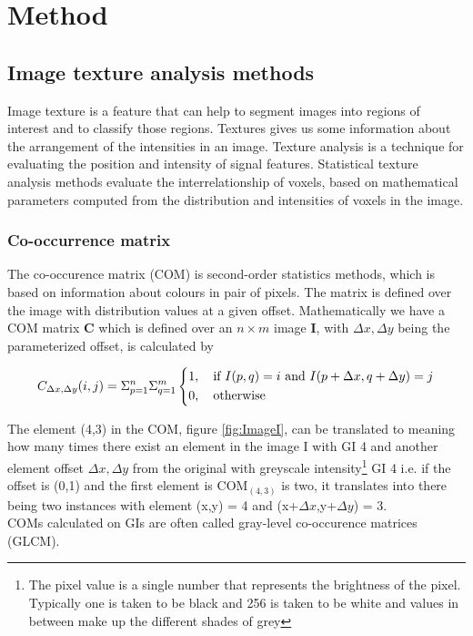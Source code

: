 \chapter{Method}


\section{Image texture analysis methods}

Image texture is a feature that can help to segment images into regions of interest and to classify those regions. Textures gives us some information about the arrangement of the intensities in an image. Texture analysis is a technique for evaluating the position and intensity of signal features\cite{Castellano}. Statistical texture analysis methods evaluate the interrelationship of voxels, based on mathematical parameters computed from the distribution and intensities of voxels in the image.

\subsection{Co-occurrence matrix}

The co-occurence matrix (COM) is second-order statistics methods, which is based on information about colours in pair of pixels. The matrix is defined over the image with distribution values at a given offset. Mathematically we have a COM matrix \textbf{C} which is defined over an $n \times m$ image \textbf{I}, with $\Delta x, \Delta y$ being the parameterized offset, is calculated by \cite{albregtsen2008statistical}

\[
C_{\Delta x, \Delta y}(i, j) = \Sigma_{p=1}^n\Sigma_{q=1}^m
\begin{dcases}
  1, \quad \text{if } I(p,q)=i \text{ and } I(p+\Delta x, q+ \Delta y) =j \\
  0, \quad \text{otherwise}
\end{dcases}
\]

The element (4,3) in the COM, figure \ref{fig:ImageI}, can be translated to meaning how many times there exist an element in the image I with GI 4 and another element offset $\Delta x, \Delta y$ from the original with greyscale intensity\footnote{The pixel value is a single number that represents the brightness of the pixel. Typically one is taken to be black and 256 is taken to be white and values in between make up the different shades of grey} GI 4 i.e. if the offset is (0,1) and the first element is COM$_{(4,3)}$  is two, it translates into there being two instances with element (x,y) = 4 and (x+$\Delta x$,y+$\Delta y$) = 3.\\
COMs calculated on GIs are often called gray-level co-occurence matrices (GLCM). 


